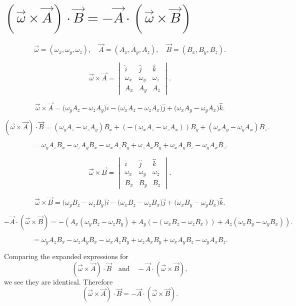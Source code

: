 \documentclass[letter, 10pts]{article}
\begin{document}
\newpage
\section*{\((\vec{\omega} \times \vec{A}) \cdot \vec{B} = -\vec{A} \cdot (\vec{\omega} \times \vec{B})\)}

\[
\vec{\omega} = (\omega_x, \omega_y, \omega_z), \quad \vec{A} = (A_x, A_y, A_z), \quad \vec{B} = (B_x, B_y, B_z).
\]

\[
\vec{\omega} \times \vec{A} = 
\begin{vmatrix}
\hat{i} & \hat{j} & \hat{k} \\
\omega_x & \omega_y & \omega_z \\
A_x & A_y & A_z
\end{vmatrix}.
\]

\[
\vec{\omega} \times \vec{A} = \big( \omega_y A_z - \omega_z A_y \big)\hat{i} - \big( \omega_x A_z - \omega_z A_x \big)\hat{j} + \big( \omega_x A_y - \omega_y A_x \big)\hat{k}.
\]


\[
(\vec{\omega} \times \vec{A}) \cdot \vec{B} = (\omega_y A_z - \omega_z A_y)B_x + (-(\omega_x A_z - \omega_z A_x))B_y + (\omega_x A_y - \omega_y A_x)B_z.
\]

\[
= \omega_y A_z B_x - \omega_z A_y B_x - \omega_x A_z B_y + \omega_z A_x B_y + \omega_x A_y B_z - \omega_y A_x B_z.
\]

\[
\vec{\omega} \times \vec{B} = 
\begin{vmatrix}
\hat{i} & \hat{j} & \hat{k} \\
\omega_x & \omega_y & \omega_z \\
B_x & B_y & B_z
\end{vmatrix}.
\]

\[
\vec{\omega} \times \vec{B} = \big( \omega_y B_z - \omega_z B_y \big)\hat{i} - \big( \omega_x B_z - \omega_z B_x \big)\hat{j} + \big( \omega_x B_y - \omega_y B_x \big)\hat{k}.
\]


\[
-\vec{A} \cdot (\vec{\omega} \times \vec{B}) = -\left(A_x (\omega_y B_z - \omega_z B_y) + A_y (-(\omega_x B_z - \omega_z B_x)) + A_z (\omega_x B_y - \omega_y B_x)\right).
\]


\[
= \omega_y A_z B_x - \omega_z A_y B_x - \omega_x A_z B_y + \omega_z A_x B_y + \omega_x A_y B_z - \omega_y A_x B_z.
\]

Comparing the expanded expressions for
\[
(\vec{\omega} \times \vec{A}) \cdot \vec{B} \quad \text{and} \quad -\vec{A} \cdot (\vec{\omega} \times \vec{B}),
\]
we see they are identical. Therefore
\[
(\vec{\omega} \times \vec{A}) \cdot \vec{B} = -\vec{A} \cdot (\vec{\omega} \times \vec{B}).
\]
\end{document}
